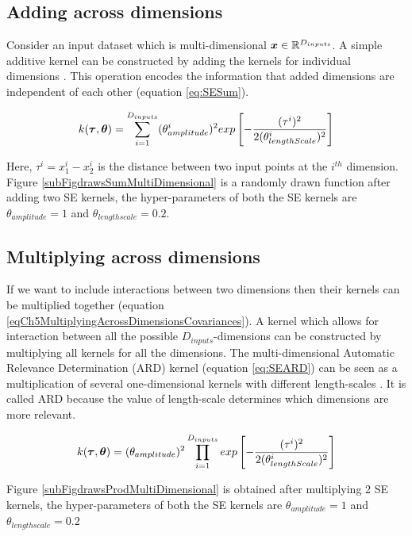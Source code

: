 \subsection{Adding across dimensions}
Consider an input dataset which is multi-dimensional $\boldsymbol{x} \in \mathbb{R}^{D_{inputs}}$. A simple additive kernel can be constructed by adding the kernels for individual dimensions \cite{hastie1990generalized}. This operation encodes the information that added dimensions are independent of each other (equation \ref{eq:SESum}). 

\begin{equation}\label{eq:SESum}
k(\boldsymbol{\tau}, \boldsymbol{\theta}) = \sum_{i=1}^{D_{inputs}} (\theta_{amplitude}^{i})^2 exp\left [ -\frac{(\tau^{i})^2}{2(\theta_{lengthScale}^{i})^2} \right ]
\end{equation}

Here, $\tau^{i} = x^{i}_{1} - x^{i}_{2}$ is the distance between two input points at the $i^{th}$ dimension. Figure \ref{subFigdrawsSumMultiDimensional} is a randomly drawn function after adding two SE kernels, the hyper-parameters of both the SE kernels are $\theta_{amplitude}=1$ and $\theta_{lengthscale}=0.2$. 

\subsection{Multiplying across dimensions}
If we want to include interactions between two dimensions then their kernels can be multiplied together (equation \ref{eqCh5MultiplyingAcrossDimensionsCovariances}). A kernel which allows for interaction between all the possible $D_{inputs}$-dimensions can be constructed by multiplying all kernels for all the dimensions. The multi-dimensional Automatic Relevance Determination (ARD) kernel (equation \ref{eq:SEARD}) can be seen as a multiplication of several one-dimensional kernels with different length-scales \cite{Rasmussen2005}. It is called ARD because the value of length-scale determines which dimensions are more relevant.

\begin{equation}\label{eq:SEARD}
k(\boldsymbol{\tau}, \boldsymbol{\theta}) = (\theta_{amplitude})^2 \prod_{i=1}^{D_{inputs}}  exp\left [ -\frac{(\tau^{i})^2}{2(\theta_{lengthScale}^{i})^2} \right ]
\end{equation}

Figure \ref{subFigdrawsProdMultiDimensional} is obtained after multiplying 2 SE kernels, the hyper-parameters of both the SE kernels are $\theta_{amplitude}=1$ and $\theta_{lengthscale}=0.2$ 

